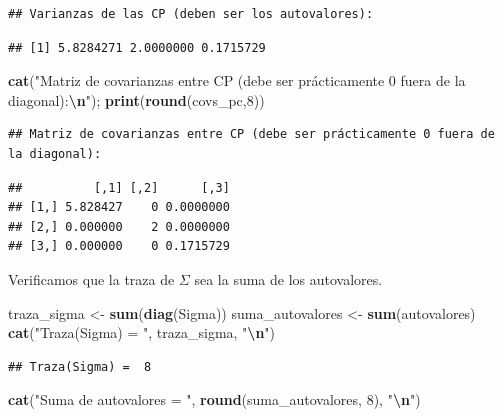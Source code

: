 \documentclass[
]{book}
\newenvironment{Shaded}{\begin{snugshade}}{\end{snugshade}}
\newcommand{\DecValTok}[1]{\textcolor[rgb]{0.00,0.00,0.81}{#1}}
\newcommand{\FunctionTok}[1]{\textcolor[rgb]{0.13,0.29,0.53}{\textbf{#1}}}
\newcommand{\NormalTok}[1]{#1}
\newcommand{\OtherTok}[1]{\textcolor[rgb]{0.56,0.35,0.01}{#1}}
\newcommand{\SpecialCharTok}[1]{\textcolor[rgb]{0.81,0.36,0.00}{\textbf{#1}}}
\newcommand{\StringTok}[1]{\textcolor[rgb]{0.31,0.60,0.02}{#1}}
\begin{document}
\begin{verbatim}
## Varianzas de las CP (deben ser los autovalores):
\end{verbatim}

\begin{verbatim}
## [1] 5.8284271 2.0000000 0.1715729
\end{verbatim}

\begin{Shaded}
\begin{Highlighting}[]
\FunctionTok{cat}\NormalTok{(}\StringTok{"Matriz de covarianzas entre CP (debe ser prácticamente 0 fuera de la diagonal):}\SpecialCharTok{\textbackslash{}n}\StringTok{"}\NormalTok{); }\FunctionTok{print}\NormalTok{(}\FunctionTok{round}\NormalTok{(covs\_pc,}\DecValTok{8}\NormalTok{))}
\end{Highlighting}
\end{Shaded}

\begin{verbatim}
## Matriz de covarianzas entre CP (debe ser prácticamente 0 fuera de la diagonal):
\end{verbatim}

\begin{verbatim}
##          [,1] [,2]      [,3]
## [1,] 5.828427    0 0.0000000
## [2,] 0.000000    2 0.0000000
## [3,] 0.000000    0 0.1715729
\end{verbatim}

Verificamos que la traza de \(\Sigma\) sea la suma de los autovalores.

\begin{Shaded}
\begin{Highlighting}[]
\NormalTok{traza\_sigma }\OtherTok{\textless{}{-}} \FunctionTok{sum}\NormalTok{(}\FunctionTok{diag}\NormalTok{(Sigma))}
\NormalTok{suma\_autovalores }\OtherTok{\textless{}{-}} \FunctionTok{sum}\NormalTok{(autovalores)}
\FunctionTok{cat}\NormalTok{(}\StringTok{"Traza(Sigma) = "}\NormalTok{, traza\_sigma, }\StringTok{"}\SpecialCharTok{\textbackslash{}n}\StringTok{"}\NormalTok{)}
\end{Highlighting}
\end{Shaded}

\begin{verbatim}
## Traza(Sigma) =  8
\end{verbatim}

\begin{Shaded}
\begin{Highlighting}[]
\FunctionTok{cat}\NormalTok{(}\StringTok{"Suma de autovalores = "}\NormalTok{, }\FunctionTok{round}\NormalTok{(suma\_autovalores, }\DecValTok{8}\NormalTok{), }\StringTok{"}\SpecialCharTok{\textbackslash{}n}\StringTok{"}\NormalTok{)}
\end{Highlighting}
\end{Shaded}
\end{document}
